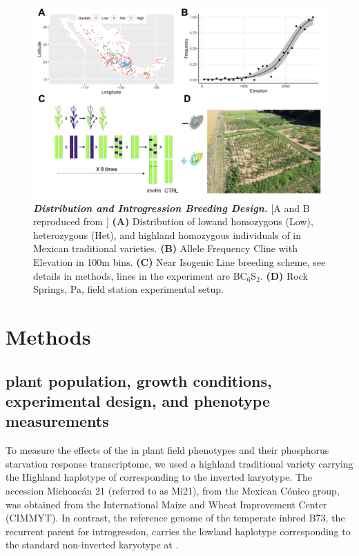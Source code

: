 \begin{figure}[!ht]
\centering
\includegraphics[width=\linewidth]{Chapter-3/figs/design.png}
\caption[\textit{\invfour} Distribution and Introgression Breeding Design]{\textit{\textbf{\invfour Distribution and Introgression Breeding Design.}} [A and B reproduced from \cite{crow2020}] \textbf{(A)} Distribution of lowand homozygous (Low), heterozygous (Het), and highland homozygous individuals of \invfour in Mexican traditional varieties.
\textbf{(B)} \invfour Allele Frequency Cline with Elevation in 100m bins.
\textbf{(C)} Near Isogenic Line breeding scheme, see details in methods, lines in the experiment are BC$_6$S$_2$.
\textbf{(D)}  Rock Springs, Pa, field station experimental setup.
}
 \label{fig::design}
\end{figure}

\section{Methods}
\subsection{\invfour plant population, growth conditions, experimental design, and phenotype measurements}

To measure the effects of the \invfour in plant field phenotypes and their phosphorus starvation response transcriptome, we used a highland traditional variety carrying the Highland haplotype of \invfour corresponding to the inverted karyotype.
The accession Michoacán 21 (referred to as Mi21), from the Mexican Cónico group, was obtained from the International Maize and Wheat Improvement Center (CIMMYT). 
In contrast, the reference genome of the temperate inbred B73, the recurrent parent for introgression, carries the lowland haplotype corresponding to the standard non-inverted karyotype at \invfour.

